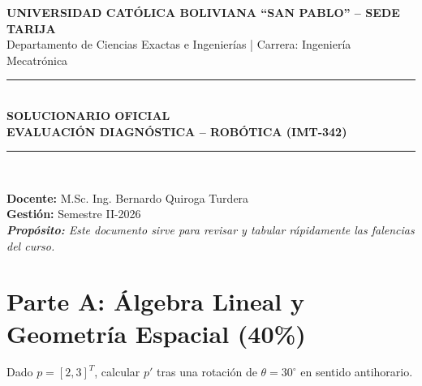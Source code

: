 \documentclass[11pt, a4paper]{article}
\begin{document}
\begin{center}
    {\Large \textbf{UNIVERSIDAD CATÓLICA BOLIVIANA ``SAN PABLO'' – SEDE TARIJA}}\\[0.2cm]
    {\large Departamento de Ciencias Exactas e Ingenierías | Carrera: Ingeniería Mecatrónica}\\[0.4cm]
    
    \rule{\textwidth}{0.5pt}\\[0.4cm]
    {\huge \textbf{SOLUCIONARIO OFICIAL}}\\[0.2cm]
    {\Large \textbf{EVALUACIÓN DIAGNÓSTICA – ROBÓTICA (IMT-342)}}\\[0.4cm]
    \rule{\textwidth}{0.5pt}\\[0.4cm]
\end{center}

\begin{flushleft}
    \textbf{Docente:} M.Sc. Ing. Bernardo Quiroga Turdera \\
    \textbf{Gestión:} Semestre II-2026 \\
    \textit{\textbf{Propósito:} Este documento sirve para revisar y tabular rápidamente las falencias del curso.}
\end{flushleft}

\vspace{0.4cm}

\section*{Parte A: Álgebra Lineal y Geometría Espacial (40\%)}

\begin{enunciado}
Dado $p = [2, 3]^T$, calcular $p'$ tras una rotación de $\theta = 30^\circ$ en sentido antihorario.
\end{enunciado}
\end{document}
